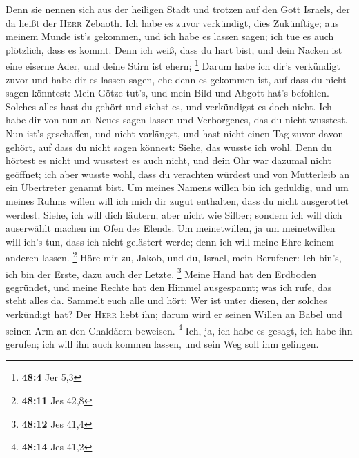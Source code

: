 Denn sie nennen sich aus der heiligen Stadt und trotzen auf den Gott
Israels, der da heißt der \textsc{Herr} Zebaoth.  Ich habe
es zuvor verkündigt, dies Zukünftige; aus meinem Munde ist's gekommen,
und ich habe es lassen sagen; ich tue es auch plötzlich, dass es kommt.
 Denn ich weiß, dass du hart bist, und dein Nacken ist
eine eiserne Ader, und deine Stirn ist ehern; \footnote{\textbf{48:4}
  Jer 5,3}  Darum habe ich dir's verkündigt zuvor und habe
dir es lassen sagen, ehe denn es gekommen ist, auf dass du nicht sagen
könntest: Mein Götze tut's, und mein Bild und Abgott hat's befohlen.
 Solches alles hast du gehört und siehst es, und
verkündigst es doch nicht. Ich habe dir von nun an Neues sagen lassen
und Verborgenes, das du nicht wusstest.  Nun ist's
geschaffen, und nicht vorlängst, und hast nicht einen Tag zuvor davon
gehört, auf dass du nicht sagen könnest: Siehe, das wusste ich wohl.
 Denn du hörtest es nicht und wusstest es auch nicht, und
dein Ohr war dazumal nicht geöffnet; ich aber wusste wohl, dass du
verachten würdest und von Mutterleib an ein Übertreter genannt bist.
 Um meines Namens willen bin ich geduldig, und um meines
Ruhms willen will ich mich dir zugut enthalten, dass du nicht
ausgerottet werdest.  Siehe, ich will dich läutern, aber
nicht wie Silber; sondern ich will dich auserwählt machen im Ofen des
Elends.  Um meinetwillen, ja um meinetwillen will ich's
tun, dass ich nicht gelästert werde; denn ich will meine Ehre keinem
anderen lassen. \footnote{\textbf{48:11} Jes 42,8}  Höre
mir zu, Jakob, und du, Israel, mein Berufener: Ich bin's, ich bin der
Erste, dazu auch der Letzte. \footnote{\textbf{48:12} Jes 41,4}
 Meine Hand hat den Erdboden gegründet, und meine Rechte
hat den Himmel ausgespannt; was ich rufe, das steht alles da.
 Sammelt euch alle und hört: Wer ist unter diesen, der
solches verkündigt hat? Der \textsc{Herr} liebt ihn; darum wird er
seinen Willen an Babel und seinen Arm an den Chaldäern beweisen.
\footnote{\textbf{48:14} Jes 41,2}  Ich, ja, ich habe es
gesagt, ich habe ihn gerufen; ich will ihn auch kommen lassen, und sein
Weg soll ihm gelingen.

